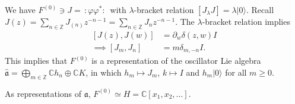 \medskip\noindent
We have $F^{(0)} \ni J = \,:\!\varphi
\varphi^*\!:\,$
with $\lambda$-bracket relation $[J_\lambda
J]=\lambda |0\rangle$.
Recall $J(z)=\sum_{n \in
\mathbb{Z}}J_{(n)}z^{-n-1}=
\sum_{n \in \mathbb{Z}}J_n z^{-n-1}$.
The $\lambda$-bracket relation implies
$$
\begin{aligned}
[J(z),J(w)]&=\partial_w \delta(z,w)I\\
\implies [J_m,J_n]&=m \delta_{m,-n}I.
\end{aligned}
$$
This implies that $F^{(0)}$ is a
representation
of the oscillator Lie algebra
$\hat{\mathfrak{a}}=\bigoplus_{m \in
\mathbb{Z}}\mathbb{C} h_n \oplus
\mathbb{C}K$,
in which $h_m \mapsto  J_m$, $k \mapsto  I$
and $h_m |0\rangle$
for all $m \geq 0$.

\begin{proposition}
\label{proposition-f0-isomo-polyn-repre}
As representations of $\mathfrak{a}$,
$F^{(0)}\simeq H=\mathbb{C}[x_1,x_2,\ldots]$.
\end{proposition}

